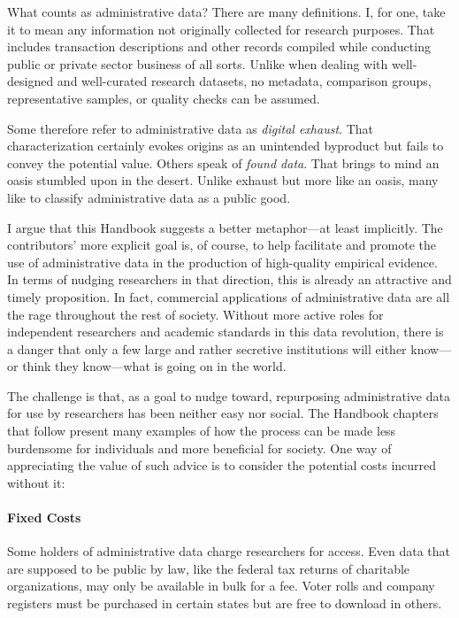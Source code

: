 What counts as administrative data? There are many definitions. I, for one, take it to mean any information not originally collected for research purposes. That includes transaction descriptions and other records compiled while conducting public or private sector business of all sorts. Unlike when dealing with well-designed and well-curated research datasets, no metadata, comparison groups, representative samples, or quality checks can be assumed.

Some therefore refer to administrative data as \emph{digital exhaust}. That characterization certainly evokes origins as an unintended byproduct but fails to convey the potential value. Others speak of \emph{found data}. That brings to mind an oasis stumbled upon in the desert. Unlike exhaust but more like an oasis, many like to classify administrative data as a public good.

I argue that this Handbook suggests a better metaphor---at least implicitly. The contributors' more explicit goal is, of course, to help facilitate and promote the use of administrative data in the production of high-quality empirical evidence. In terms of nudging researchers in that direction, this is already an attractive and timely proposition. In fact, commercial applications of administrative data are all the rage throughout the rest of society. Without more active roles for independent researchers and academic standards in this data revolution, there is a danger that only a few large and rather secretive institutions will either know---or think they know---what is going on in the world.

The challenge is that, as a goal to nudge toward, repurposing administrative data for use by researchers has been neither easy nor social. The Handbook chapters that follow present many examples of how the process can be made less burdensome for individuals and more beneficial for society. One way of appreciating the value of such advice is to consider the potential costs incurred without it:

\paragraph{Fixed Costs}

Some holders of administrative data charge researchers for access. Even
data that are supposed to be public by law, like the federal tax returns
of charitable organizations, may only be available in bulk for a fee.
Voter rolls and company registers must be purchased in certain states
but are free to download in others.

